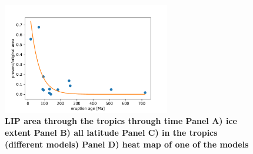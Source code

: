 \documentclass[11pt,letterpaper]{article}
\begin{document}
\begin{figure}[h!]
\begin{center}
	\includegraphics[width=0.65\textwidth]{Manuscript/Figures/LIP_Preservation.pdf}
	\caption{\textbf{LIP area through the tropics through time
Panel A) ice extent
Panel B) all latitude 
Panel C) in the tropics (different models)
Panel D) heat map of one of the models}}
	\label{fig:LIP_area}
\end{center}
\end{figure}
\end{document}
